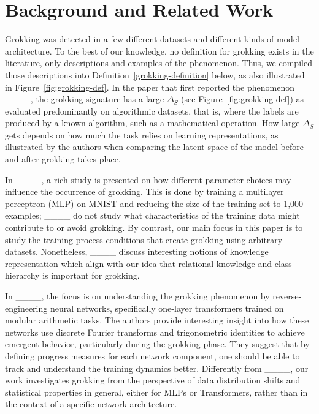\section{Background and Related Work}
\label{sec:background}
Grokking was detected in a few different datasets and different kinds of model architecture. To the best of our knowledge, no definition for grokking exists in the literature, only descriptions and examples of the phenomenon.
Thus, we compiled those descriptions into Definition~\ref{grokking-definition} below, as also illustrated in Figure~\ref{fig:grokking-def}. In the paper that first reported the phenomenon ____, the grokking signature has a large $\Delta_S$ (see Figure~\ref{fig:grokking-def}) as evaluated predominantly on algorithmic datasets, that is, where the labels are produced by a known algorithm, such as a mathematical operation. How large $\Delta_S$ gets depends on how much the task relies on learning representations, as illustrated by the authors when comparing the latent space of the model before and after grokking takes place. 

In ____, a rich study is presented on how different parameter choices may influence the occurrence of grokking. This is done by training a multilayer perceptron (MLP) on MNIST and reducing the size of the training set to 1,000 examples; ____ do not study what characteristics of the training data might contribute to or avoid grokking. By contrast, our main focus in this paper is to study the training process conditions that create grokking using arbitrary datasets. Nonetheless, ____ discuss interesting notions of knowledge representation which align with our idea that relational knowledge and class hierarchy is important for grokking.     

In ____, the focus is on understanding the grokking phenomenon by reverse-engineering neural networks, specifically one-layer transformers trained on modular arithmetic tasks. %
The authors provide interesting insight into how these networks use discrete Fourier transforms and trigonometric identities to achieve emergent behavior, particularly during the grokking phase. They suggest that by defining progress measures for each network component, one should be able to track and understand the training dynamics better. %
Differently from ____, our work investigates grokking from the perspective of data distribution shifts and statistical properties in general, either for MLPs or Transformers, rather than in the context of a specific network architecture. %

